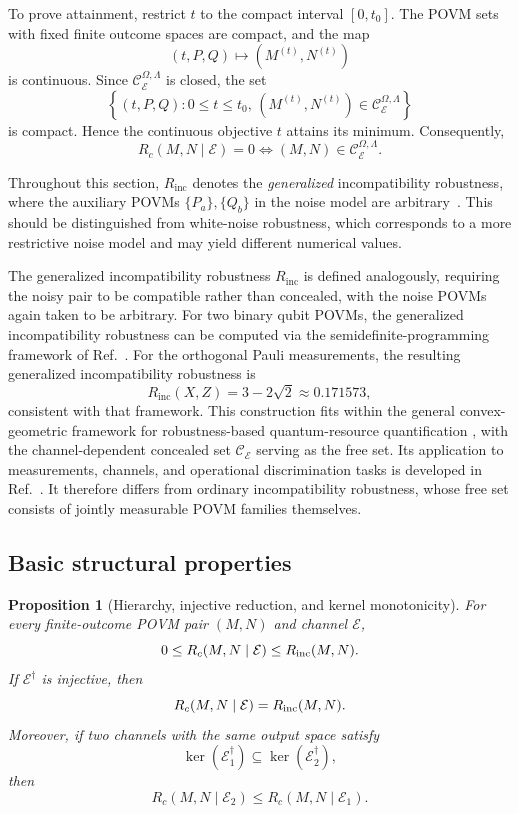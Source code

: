 \documentclass[
aps,pra,twocolumn,10pt,
superscriptaddress,longbibliography,floatfix
]{revtex4-2}
\newtheorem{proposition}[theorem]{Proposition}
\begin{document}
To prove attainment, restrict $t$ to the compact interval $[0,t_0]$. The POVM sets with fixed finite outcome spaces are compact, and the map
\[
(t,P,Q)\longmapsto (M^{(t)},N^{(t)})
\]
is continuous. Since $\mathcal C_{\mathcal E}^{\Omega,\Lambda}$ is closed, the set
\[
\left\{
(t,P,Q):
0\le t\le t_0,\,
(M^{(t)},N^{(t)})
\in\mathcal C_{\mathcal E}^{\Omega,\Lambda}
\right\}
\]
is compact. Hence the continuous objective $t$ attains its minimum. Consequently,
\[
R_c(M,N\mid\mathcal E)=0
\iff
(M,N)\in\mathcal C_{\mathcal E}^{\Omega,\Lambda}.
\]

Throughout this section, $R_{\mathrm{inc}}$ denotes the \emph{generalized} incompatibility robustness, where the auxiliary POVMs $\{P_a\}, \{Q_b\}$ in the noise model are arbitrary~\cite{Uola2015,Designolle2019}. This should be distinguished from white-noise robustness, which corresponds to a more restrictive noise model and may yield different numerical values.

The generalized incompatibility robustness $R_{\mathrm{inc}}$ is defined analogously, requiring the noisy pair to be compatible rather than concealed, with the noise POVMs again taken to be arbitrary. For two binary qubit POVMs, the generalized incompatibility robustness can be computed via the semidefinite-programming framework of Ref.~\cite{Designolle2019}. For the orthogonal Pauli measurements, the resulting generalized incompatibility robustness is
\[
R_{\mathrm{inc}}(X,Z)=3-2\sqrt2\approx0.171573,
\]
consistent with that framework. This construction fits within the general convex-geometric framework for robustness-based quantum-resource quantification \cite{Regula2018}, with the channel-dependent concealed set $\mathcal C_{\mathcal E}$ serving as the free set. Its application to measurements, channels, and operational discrimination tasks is developed in Ref.~\cite{Takagi2019}. It therefore differs from ordinary incompatibility robustness, whose free set consists of jointly measurable POVM families themselves.

\subsection{Basic structural properties}

\begin{proposition}[Hierarchy, injective reduction, and kernel monotonicity]
\label{prop:robustness_basic}
For every finite-outcome POVM pair $(M,N)$ and channel $\mathcal E$,
\[
0\le R_c(M,N\mid\mathcal E)\le R_{\rm inc}(M,N).
\]
If $\mathcal E^\dagger$ is injective, then
\[
R_c(M,N\mid\mathcal E)=R_{\rm inc}(M,N).
\]
Moreover, if two channels with the same output space satisfy
\[
\ker(\mathcal E_1^\dagger)\subseteq\ker(\mathcal E_2^\dagger),
\]
then
\[
R_c(M,N\mid\mathcal E_2)
\le
R_c(M,N\mid\mathcal E_1).
\]
\end{proposition}
\end{document}
